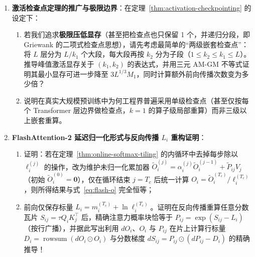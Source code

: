 
\begin{enumerate}
  \item[\textbf{6.5.3}] \textbf{激活检查点定理的推广与极限边界}：在定理~\ref{thm:activation-checkpointing} 的设定下：
  \begin{enumerate}
    \item 若我们追求\textbf{极限压低显存}（甚至把检查点也只保留 1 个，并递归分段，即 Griewank 的二项式检查点思想），请先考虑最简单的“两级嵌套检查点”：将 $L$ 层分为 $L / k_1$ 个大段，每大段再按 $k_2$ 分为子段（$1 \le k_2 \le k_1 \le L$）。推导峰值激活显存关于 $(k_1, k_2)$ 的表达式，并用三元 AM-GM 不等式证明其最小显存可进一步降至 $3 L^{1/3} M_1$，同时计算额外前向传播次数变为多少倍？
    \item 说明在真实大规模预训练中为何工程界普遍采用单级检查点（甚至仅按每个 Transformer 层边界做检查点，$k = 1$ 的算子级局部重算）而非三级以上嵌套重算。
  \end{enumerate}

  \item[\textbf{6.5.4}] \textbf{FlashAttention-2 延迟归一化形式与反向传播 $L_i$ 重构证明}：
  \begin{enumerate}
    \item 证明：若在定理~\ref{thm:online-softmax-tiling} 的内循环中去掉每步除以 $\ell_i^{(j)}$ 的操作，改为维护未归一化累加器 $\tilde{O}_i^{(j)} = \alpha_i^{(j)} \tilde{O}_i^{(j-1)} + \tilde{P}_{ij} V_j$（初始 $\tilde{O}_i^{(0)} = \mathbf{0}$），仅在循环结束 $j = T_c$ 后统一计算 $O_i = \tilde{O}_i^{(T_c)} / \ell_i^{(T_c)}$，则所得结果与式~\eqref{eq:flash-o} 完全恒等；
    \item 前向仅保存标量 $L_i = m_i^{(T_c)} + \ln \ell_i^{(T_c)}$。证明在反向传播重算任意分数瓦片 $S_{ij} = \tau Q_i K_j^\top$ 后，精确注意力概率块恰等于 $P_{ij} = \exp(S_{ij} - L_i)$（按行广播），并据此写出利用 $dO_i$、$O_i$ 与 $P_{ij}$ 在片上计算行标量 $D_i = \operatorname{rowsum}(dO_i \odot O_i)$ 与分数梯度 $dS_{ij} = P_{ij} \odot (dP_{ij} - D_i)$ 的精确推导！
  \end{enumerate}
\end{enumerate}

